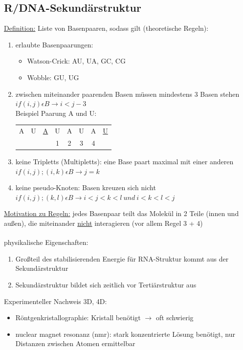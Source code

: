 \documentclass[12pt,a4paper]{article}
\begin{document}
\subsection{R/DNA-Sekundärstruktur}
\underline{Definition:} Liste von Basenpaaren, sodass gilt (theoretische Regeln):
\begin{enumerate}
	\item erlaubte Basenpaarungen:
	\begin{itemize}
		\item Watson-Crick: AU, UA, GC, CG 
		\item Wobble: GU, UG
	\end{itemize}
	\item zwischen miteinander paarenden Basen müssen mindestens 3 Basen stehen
	$if(i,j) \epsilon B \rightarrow i < j-3 $\\
	Beispiel Paarung A und U:
	\begin{tabular}{cccccccc}
  		A & U & \underline{A} & U & A & U & A & \underline{U}\\
  		  &   &   & 1 & 2 & 3 & 4 &  \\
 	\end{tabular}
	\item keine Tripletts (Multipletts): eine Base paart maximal mit einer anderen
	$if(i,j);(i,k) \epsilon B \rightarrow j=k $
	\item keine pseudo-Knoten: Basen kreuzen sich nicht
	$if(i,j);(k,l) \epsilon B \rightarrow i<j<k<l\ und\ i<k<l<j $
\end{enumerate}

\underline{Motivation zu Regeln:} jedes Basenpaar teilt das Molekül in 2 Teile (innen und außen), die miteinander \underline{nicht} interagieren (vor allem Regel 3 + 4)
\\\\
physikalische Eigenschaften:
\begin{enumerate}
	\item Großteil des stabilisierenden Energie für RNA-Struktur kommt aus der Sekundärstruktur
	\item Sekundärstruktur bildet sich zeitlich vor Tertiärstruktur aus
\end{enumerate}

Experimenteller Nachweis 3D, 4D:
\begin{itemize}
	\item Röntgenkristallographie: Kristall benötigt $\rightarrow$ oft schwierig
	\item nuclear magnet resonanz (nmr): stark konzentrierte Lösung benötigt, nur Distanzen zwischen Atomen ermittelbar
\end{itemize}
\end{document}

